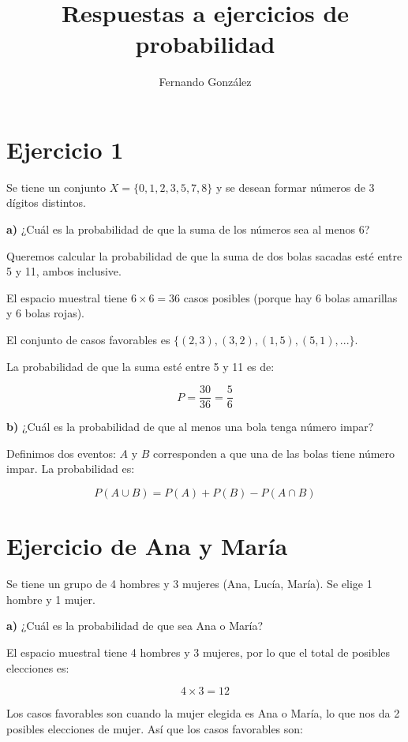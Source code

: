 \documentclass{article}
\begin{document}
\title{Respuestas a ejercicios de probabilidad}
\author{Fernando González}
\date{}
\maketitle


\section{Ejercicio 1}

Se tiene un conjunto \( X = \{0, 1, 2, 3, 5, 7, 8\} \) y se desean formar números de 3 dígitos distintos.

\textbf{a)} ¿Cuál es la probabilidad de que la suma de los números sea al menos 6?

Queremos calcular la probabilidad de que la suma de dos bolas sacadas esté entre 5 y 11, ambos inclusive.

El espacio muestral tiene \( 6 	\times 6 = 36 \) casos posibles (porque hay 6 bolas amarillas y 6 bolas rojas).

El conjunto de casos favorables es \( \{(2, 3), (3, 2), (1, 5), (5, 1), ...\} \).

La probabilidad de que la suma esté entre 5 y 11 es de:

\[
P = \frac{30}{36} = \frac{5}{6}
\]

\textbf{b)} ¿Cuál es la probabilidad de que al menos una bola tenga número impar?

Definimos dos eventos: \( A \) y \( B \) corresponden a que una de las bolas tiene número impar. La probabilidad es:

\[
P(A \cup B) = P(A) + P(B) - P(A \cap B)
\]

\section{Ejercicio de Ana y María}

Se tiene un grupo de 4 hombres y 3 mujeres (Ana, Lucía, María). Se elige 1 hombre y 1 mujer.

\textbf{a)} ¿Cuál es la probabilidad de que sea Ana o María?

El espacio muestral tiene 4 hombres y 3 mujeres, por lo que el total de posibles elecciones es:

\[
4 \times 3 = 12
\]

Los casos favorables son cuando la mujer elegida es Ana o María, lo que nos da 2 posibles elecciones de mujer. Así que los casos favorables son:
\end{document}
